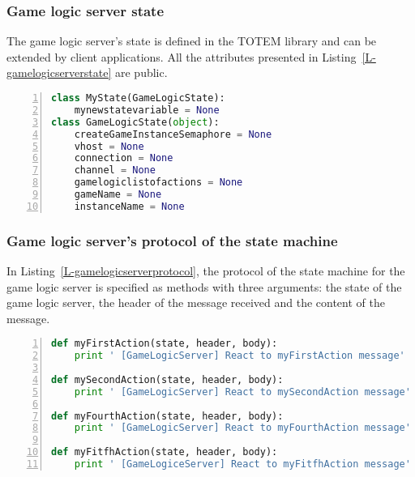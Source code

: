 \subsubsection{Game logic server state}

The game logic server's state is defined in the TOTEM library and can be
extended by client applications. All the attributes presented in
Listing~\ref{L-gamelogicserverstate} are public.

\begin{lstlisting}[float=htbp,frame=bt,basicstyle=\scriptsize\sffamily,numbers=left,
   numberstyle=\tiny, stepnumber=1,
    numbersep=5pt,language=python,label=L-gamelogicserverstate,caption=Game logic server's state]
class MyState(GameLogicState):
    mynewstatevariable = None
class GameLogicState(object):
    createGameInstanceSemaphore = None
    vhost = None
    connection = None
    channel = None
    gamelogiclistofactions = None
    gameName = None
    instanceName = None
\end{lstlisting}


\subsubsection{Game logic server's protocol of the state machine}

In Listing~\ref{L-gamelogicserverprotocol}, the protocol of the state
machine for the game logic server is specified as methods with three
arguments: the state of the game logic server, the header of the
message received and the content of the message.

\begin{lstlisting}[float=htbp,frame=bt,basicstyle=\scriptsize\sffamily,numbers=left,
   numberstyle=\tiny, stepnumber=1,
    numbersep=5pt,language=python,label=L-gamelogicserverprotocol,caption=Game logic server's protocol of the state machine]
def myFirstAction(state, header, body):
    print ' [GameLogicServer] React to myFirstAction message'

def mySecondAction(state, header, body):
    print ' [GameLogicServer] React to mySecondAction message'

def myFourthAction(state, header, body):
    print ' [GameLogicServer] React to myFourthAction message'

def myFitfhAction(state, header, body):
    print ' [GameLogiceServer] React to myFitfhAction message'
\end{lstlisting}

\endinput
